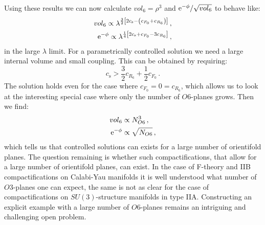 \documentclass[a4paper,12pt,twoside,openright]{report}
\newcommand{\be}{\begin{equation}}
\newcommand{\ee}{\end{equation}}
\newcommand{\bea}{\begin{equation}\begin{aligned}}
\newcommand{\eea}{\end{aligned}\end{equation}}
\def\rme{{\rm e}}
\begin{document}
Using these results we can now calculate $vol_6 = \rho^3$ and $\rme^ {-\phi}/\sqrt{vol_6}$ to behave like:
\bea 
vol_6 \propto \lambda^ {\frac{3}{2} \left[ 2 c_{\text{s}} - \left(c_{F_0} + c_{R_6}\right)\right]}\,,\\
\rme^ {-\phi} \propto \lambda^ {\frac{1}{4} \left[2c_{\text{s}}+c_{F_0} -3 c_{R_6}\right]}\,,
\eea
in the large $\lambda$ limit. For a parametrically controlled solution we need a large internal volume and small coupling. This can be obtained by requiring:
\be 
c_{\text{s}} > \frac{3}{2} c_{R_6} + \frac{1}{2} c_{F_0}\,.
\ee
The solution holds even for the case where $c_{F_0} = 0 = c_{R_6}$, which allows us to look at the interesting special case where only the number of $O6$-planes grows. Then we find:
\bea
vol_6 &\propto N^ 3_{O6}\,,\\
\rme^ {-\phi} &\propto \sqrt{N_{O6}}\,,
\eea
which tells us that controlled solutions can exists for a large number of orientifold planes. The question remaining is whether such compactifications, that allow for a large number of orientifold planes, can exist. In the case of F-theory and IIB compactifications on Calabi-Yau manifolds it is well understood what number of $O3$-planes one can expect, the same is not as clear for the case of compactifications on $SU(3)$-structure manifolds in type IIA. Constructing an explicit example with a large number of $O6$-planes remains an intriguing and challenging open problem.
\end{document}

